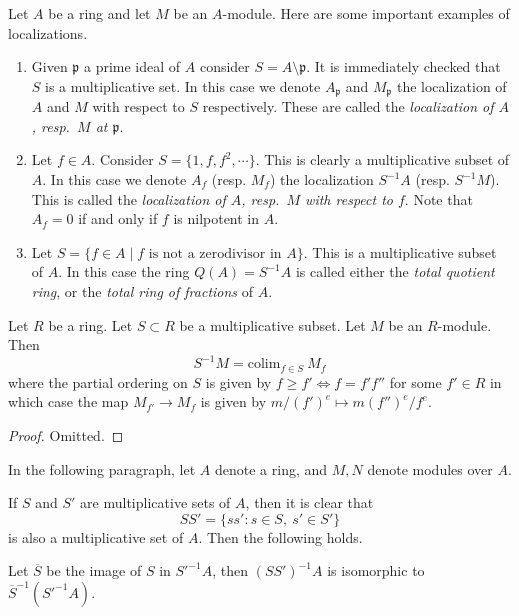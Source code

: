 \begin{example}
\label{example-localize-at-prime}
Let $A$ be a ring and let $M$ be an $A$-module.
Here are some important examples of localizations.
\begin{enumerate}
\item Given $\mathfrak p$ a prime ideal of $A$ consider
$S = A\setminus\mathfrak p$. It is
immediately checked that $S$ is a multiplicative set. In this case
we denote $A_\mathfrak p$ and $M_\mathfrak p$ the localization of
$A$ and $M$ with respect to $S$ respectively. These are
called the {\it localization of $A$, resp.\ $M$ at $\mathfrak p$}.
\item Let $f\in A$. Consider $S = \{1, f, f^2, \cdots\}$.
This is clearly a multiplicative subset of $A$.
In this case we denote $A_f$
(resp. $M_f$) the localization $S^{-1}A$ (resp. $S^{-1}M$).
This is called the {\it localization of $A$, resp.\ $M$ with
respect to $f$}.
Note that $A_f = 0$ if and only if $f$ is nilpotent in $A$.
\item Let $S = \{f \in A \mid f \text{ is not a zerodivisor in }A\}$.
This is a multiplicative subset of $A$. In this case the
ring $Q(A) = S^{-1}A$ is called either the
{\it total quotient ring}, or the {\it total ring of fractions}
of $A$.
\end{enumerate}
\end{example}

\begin{lemma}
\label{lemma-localization-colimit}
Let $R$ be a ring.
Let $S \subset R$ be a multiplicative subset.
Let $M$ be an $R$-module.
Then
$$
S^{-1}M = \text{colim}_{f \in S}\ M_f
$$
where the partial ordering on $S$ is given by
$f \geq f' \Leftrightarrow f = f'f''$ for some $f' \in R$
in which case the map $M_{f'} \to M_f$ is given
by $m/(f')^e \mapsto m(f'')^e/f^e$.
\end{lemma}

\begin{proof}
Omitted.
\end{proof}

\noindent
In the following paragraph,
let $A$ denote a ring,
and $M, N$ denote modules over $A$.

\medskip\noindent
If $S$ and $S'$ are multiplicative sets of $A$, then it is
clear that
$$
SS' = \{ss' : s\in S, \ s'\in S'\}
$$
is also a multiplicative set of $A$. Then the following holds.

\begin{proposition}
\label{proposition-localize-twice}
Let $\overline{S}$ be the image of $S$ in $S'^{-1}A$, then
$(SS')^{-1}A$ is isomorphic to $\overline{S}^{-1}(S'^{-1}A)$.
\end{proposition}


